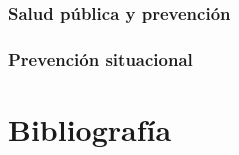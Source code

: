 \documentclass[
  spanish,
  letterpaper,
  DIV=11,
  numbers=noendperiod]{scrreprt}
\begin{document}
\subsection{Salud pública y
prevención}\label{salud-puxfablica-y-prevenciuxf3n}

\subsection{Prevención situacional}\label{prevenciuxf3n-situacional}


\chapter*{Bibliografía}\label{bibliografuxeda}

\end{document}
